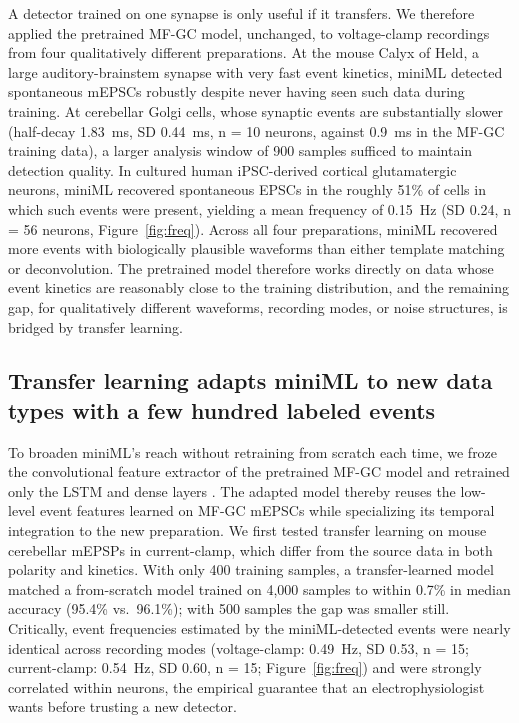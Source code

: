 \documentclass[11pt]{article}
\begin{document}
A detector trained on one synapse is only useful if it transfers. We
therefore applied the pretrained MF-GC model, unchanged, to voltage-clamp
recordings from four qualitatively different preparations. At the mouse
Calyx of Held, a large auditory-brainstem synapse with very fast event
kinetics, miniML detected spontaneous mEPSCs robustly despite never having
seen such data during training. At cerebellar Golgi cells, whose synaptic
events are substantially slower (half-decay 1.83~ms, SD 0.44~ms, n = 10
neurons, against 0.9~ms in the MF-GC training data), a larger analysis
window of 900 samples sufficed to maintain detection quality. In cultured
human iPSC-derived cortical glutamatergic neurons, miniML recovered
spontaneous EPSCs in the roughly 51\% of cells in which such events were
present, yielding a mean frequency of 0.15~Hz (SD 0.24, n = 56 neurons,
Figure~\ref{fig:freq}). Across all four preparations, miniML recovered more
events with biologically plausible waveforms than either template matching
or deconvolution. The pretrained model therefore works directly on data
whose event kinetics are reasonably close to the training distribution, and
the remaining gap, for qualitatively different waveforms, recording modes,
or noise structures, is bridged by transfer learning.

\subsection{Transfer learning adapts miniML to new data types with a few hundred labeled events}

To broaden miniML's reach without retraining from scratch each time, we froze
the convolutional feature extractor of the pretrained MF-GC model and
retrained only the LSTM and dense layers
\citep{yosinski2014transferable, theodoris2023transfer}. The adapted model
thereby reuses the low-level event features learned on MF-GC mEPSCs while
specializing its temporal integration to the new preparation. We first
tested transfer learning on mouse cerebellar mEPSPs in current-clamp, which
differ from the source data in both polarity and kinetics. With only 400
training samples, a transfer-learned model matched a from-scratch model
trained on 4{,}000 samples to within 0.7\% in median accuracy (95.4\% vs.\
96.1\%); with 500 samples the gap was smaller still. Critically, event
frequencies estimated by the miniML-detected events were nearly identical
across recording modes (voltage-clamp: 0.49~Hz, SD 0.53, n = 15;
current-clamp: 0.54~Hz, SD 0.60, n = 15; Figure~\ref{fig:freq}) and were
strongly correlated within neurons, the empirical guarantee that an
electrophysiologist wants before trusting a new detector.
\end{document}
